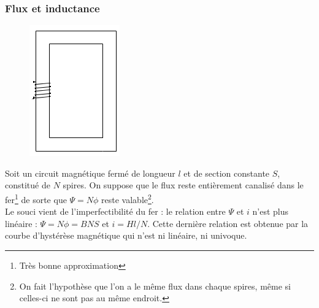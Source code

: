 		\subsubsection{Flux et inductance}
		\begin{figure}
		\vspace{-5mm}
		\includegraphics[scale=0.4]{ch3/image4.png}
		\end{figure}
		Soit un circuit magnétique fermé de longueur $l$ et de section 
		constante $S$, constitué de $N$ spires. On suppose que le flux
		reste entièrement canalisé dans le fer\footnote{Très bonne 
		approximation} de sorte que $\Psi = N\phi$ reste valable\footnote{On 
		fait l'hypothèse que l'on a le même flux dans chaque spires, même si 
		celles-ci ne sont pas au même endroit.}.\\
		Le souci vient de l'imperfectibilité du fer : le relation entre 
		$\Psi$ et $i$ n'est plus linéaire : $\Psi = N\phi = BNS$ et 
		$i= H l/N$. Cette dernière relation est obtenue par la courbe 
		d'hystérèse magnétique qui n'est ni linéaire, ni univoque.\\
		
